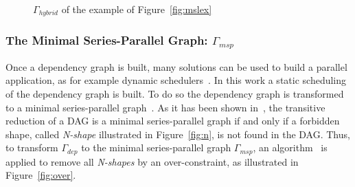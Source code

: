 \begin{figure}[t]
\begin{center}
\caption{$\Gamma_{hybrid}$ of the example of Figure~\ref{fig:mslex}}
\label{fig:hyb}
\end{center}
\end{figure}

\subsubsection*{The Minimal Series-Parallel Graph: $\Gamma_{msp}$}
Once a dependency graph is built, many solutions can be used to build a parallel application, as for example dynamic schedulers~\cite{Augonnet2011,Gautier:2013:XRS:2510661.2511383}. In this work a static scheduling of the dependency graph is built. To do so the dependency graph is transformed to a minimal series-parallel graph~\cite{Valdes:1979:RSP:800135.804393}. As it has been shown in~\cite{Valdes:1979:RSP:800135.804393}, the transitive reduction of a DAG is a minimal series-parallel graph if and only if a forbidden shape, called \emph{N-shape} illustrated in Figure~\ref{fig:n}, is not found in the DAG. Thus, to transform $\Gamma_{dep}$ to the minimal series-parallel graph $\Gamma_{msp}$, an algorithm~\cite{Mitchell:2004:CMV:1082101.1082117} is applied to remove all \emph{N-shapes} by an over-constraint, as illustrated in Figure~\ref{fig:over}.


